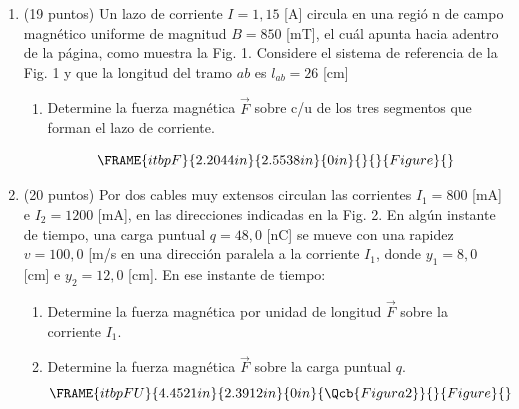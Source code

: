 \documentclass{article}
\begin{document}
\begin{enumerate}
\item (19 puntos) Un lazo de corriente $I=1,15$ [A] circula en una regi\'{o}%
n de campo magn\'{e}tico uniforme de magnitud $B=850$ [mT], el cu\'{a}l
apunta hacia adentro de la p\'{a}gina, como muestra la Fig. 1. Considere el
sistema de referencia de la Fig. 1 y que la longitud del tramo $ab$ es $%
l_{ab}=26$ [cm]

\begin{enumerate}
\item Determine la fuerza magn\'{e}tica $\vec{F}$ sobre c/u de los tres
segmentos que forman el lazo de corriente.

\begin{equation*}
\FRAME{itbpF}{2.2044in}{2.5538in}{0in}{}{}{Figure}{\special{language
"Scientific Word";type "GRAPHIC";maintain-aspect-ratio TRUE;display
"USEDEF";valid_file "T";width 2.2044in;height 2.5538in;depth
0in;original-width 3.4835in;original-height 4.0413in;cropleft "0";croptop
"1";cropright "1";cropbottom "0";tempfilename
'QWKC2V01.wmf';tempfile-properties "XPR";}}
\end{equation*}%
\pagebreak
\end{enumerate}

\item (20 puntos) Por dos cables muy extensos circulan las corrientes $%
I_{1}=800$ [mA] e $I_{2}=1200$ [mA], en las direcciones indicadas en la Fig.
2. En alg\'{u}n instante de tiempo, una carga puntual $q=48,0$ [nC] se mueve
con una rapidez $v=100,0$ [m/s\NEG{]} en una direcci\'{o}n paralela a la
corriente $I_{1}$, donde $y_{1}=8,0$ [cm] e $y_{2}=12,0$ [cm]. En ese
instante de tiempo:

\begin{enumerate}
\item Determine la fuerza magn\'{e}tica por unidad de longitud $\vec{F}$
sobre la corriente $I_{1}.$

\item Determine la fuerza magn\'{e}tica $\vec{F}$ sobre la carga puntual $q.$
\begin{equation*}
\FRAME{itbpFU}{4.4521in}{2.3912in}{0in}{\Qcb{Figura 2}}{}{Figure}{\special%
{language "Scientific Word";type "GRAPHIC";maintain-aspect-ratio
TRUE;display "USEDEF";valid_file "T";width 4.4521in;height 2.3912in;depth
0in;original-width 6.8666in;original-height 3.6754in;cropleft "0";croptop
"1";cropright "1";cropbottom "0";tempfilename
'QWKCF902.wmf';tempfile-properties "XPR";}}
\end{equation*}
\end{enumerate}


\end{enumerate}
\end{document}
